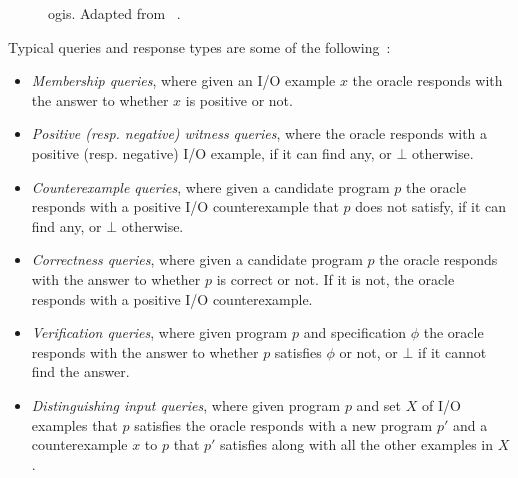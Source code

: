 \begin{figure}[htb]
  \centering
  \caption{\Acrlong{ogis}. Adapted from
    \protect\citeauthor{Jha:2017:TFS}~\protect\cite{Jha:2017:TFS}.}
  \label{fig:ogis}
\end{figure}

Typical queries and response types are some of the following~\cite{Jha:2017:TFS}:

\begin{itemize}
\item \textit{Membership queries}, where given an I/O example $x$ the oracle
  responds with the answer to whether $x$ is positive or not.
\item \textit{Positive (resp. negative) witness queries}, where the oracle
  responds with a positive (resp. negative) I/O example, if it can find any, or
  $\bot$ otherwise.
\item \textit{Counterexample queries}, where given a candidate program $p$ the
  oracle responds with a positive I/O counterexample that $p$ does not satisfy,
  if it can find any, or $\bot$ otherwise.
\item \textit{Correctness queries}, where given a candidate program $p$ the
  oracle responds with the answer to whether $p$ is correct or not. If it is not,
  the oracle responds with a positive I/O counterexample.
\item \textit{Verification queries}, where given program $p$ and specification
  $\phi$ the oracle responds with the answer to whether $p$ satisfies $\phi$ or
  not, or $\bot$ if it cannot find the answer.
\item \textit{Distinguishing input queries}, where given program $p$ and set $X$
  of I/O examples that $p$ satisfies the oracle responds with a new program $p'$
  and a counterexample $x$ to $p$ that $p'$ satisfies along with all the other
  examples in $X$.
\end{itemize}

